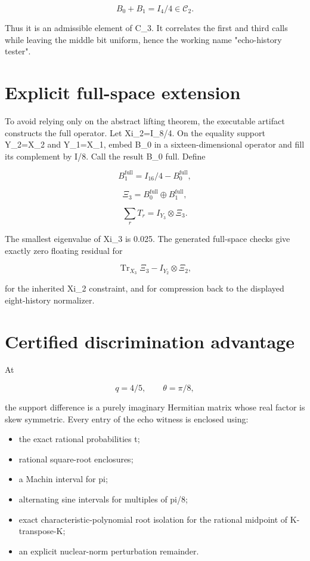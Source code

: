 \documentclass[11pt,a4paper,openany]{report}
\begin{document}
\[
B_0+B_1=I_4/4\in\mathcal C_2.
\]

Thus it is an admissible element of C\_3. It correlates the first and third calls while leaving the middle bit uniform, hence the working name "echo-history tester".

\section{Explicit full-space extension}

To avoid relying only on the abstract lifting theorem, the executable artifact constructs the full operator. Let Xi\_2=I\_8/\allowbreak{}4. On the equality support Y\_2=X\_2 and Y\_1=X\_1, embed B\_0 in a sixteen-dimensional operator and fill its complement by I/\allowbreak{}8. Call the result B\_0 full. Define

\[
B_1^{\mathrm{full}}=I_{16}/4-B_0^{\mathrm{full}},
\]

\[
\Xi_3=B_0^{\mathrm{full}}\oplus B_1^{\mathrm{full}},
\]

\[
\sum_rT_r=I_{Y_3}\otimes\Xi_3.
\]

The smallest eigenvalue of Xi\_3 is 0.025. The generated full-space checks give exactly zero floating residual for

\[
\operatorname{Tr}_{X_3}\Xi_3-I_{Y_2}\otimes\Xi_2,
\]

for the inherited Xi\_2 constraint, and for compression back to the displayed eight-history normalizer.

\section{Certified discrimination advantage}

At

\[
q=4/5,
\qquad\theta=\pi/8,
\]

the support difference is a purely imaginary Hermitian matrix whose real factor is skew symmetric. Every entry of the echo witness is enclosed using:

\begin{itemize}
\item 
the exact rational probabilities t;

\item 
rational square-root enclosures;

\item 
a Machin interval for pi;

\item 
alternating sine intervals for multiples of pi/\allowbreak{}8;

\item 
exact characteristic-polynomial root isolation for the rational midpoint of K-transpose-K;

\item 
an explicit nuclear-norm perturbation remainder.

\end{itemize}
\end{document}
